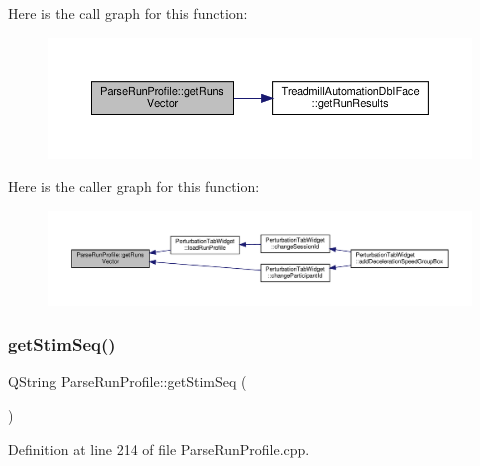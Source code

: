 Here is the call graph for this function\+:
\nopagebreak
\begin{figure}[H]
\begin{center}
\leavevmode
\includegraphics[width=350pt]{class_parse_run_profile_aa55bcd03acbae8ae4dbb93125982f7fc_cgraph}
\end{center}
\end{figure}
Here is the caller graph for this function\+:
\nopagebreak
\begin{figure}[H]
\begin{center}
\leavevmode
\includegraphics[width=350pt]{class_parse_run_profile_aa55bcd03acbae8ae4dbb93125982f7fc_icgraph}
\end{center}
\end{figure}
\mbox{\label{class_parse_run_profile_a4778a2e2bc77c46a0686c548d218739b}} 
\subsubsection{\texorpdfstring{get\+Stim\+Seq()}{getStimSeq()}}
{\footnotesize\ttfamily Q\+String Parse\+Run\+Profile\+::get\+Stim\+Seq (\begin{DoxyParamCaption}{ }\end{DoxyParamCaption})}



Definition at line 214 of file Parse\+Run\+Profile.\+cpp.

